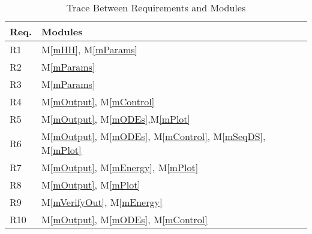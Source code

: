 \documentclass[12pt]{article}
\newcommand{\mref}[1]{M\ref{#1}}
\begin{document}
\begin{table}[H]
\centering
\begin{tabular}{p{} p{}}
\toprule
\textbf{Req.} & \textbf{Modules}\\
\midrule
R1 & \mref{mHH}, \mref{mParams}\\ %
R2 & \mref{mParams}\\ %
R3 & \mref{mParams}\\ %
R4 & \mref{mOutput}, \mref{mControl}\\
R5 & \mref{mOutput}, \mref{mODEs},\mref{mPlot}\\
R6 & \mref{mOutput}, \mref{mODEs}, \mref{mControl}, \mref{mSeqDS}, \mref{mPlot}\\
R7 & \mref{mOutput}, \mref{mEnergy}, \mref{mPlot}\\
R8 & \mref{mOutput}, \mref{mPlot}\\
R9 & \mref{mVerifyOut}, \mref{mEnergy}\\
R10 & \mref{mOutput}, \mref{mODEs}, \mref{mControl}\\
\bottomrule
\end{tabular}
\caption{Trace Between Requirements and Modules}
\label{TblRT}
\end{table}
\end{document}
